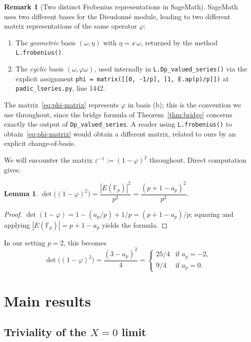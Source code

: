 \documentclass[11pt,a4paper]{amsart}
\newtheorem{lemma}[theorem]{Lemma}
\theoremstyle{definition}
\newtheorem{remark}[theorem]{Remark}
\newcommand{\F}{\mathbb{F}}
\newcommand{\eps}{\varepsilon}
\begin{document}
\begin{remark}[Two distinct Frobenius representations in SageMath]\label{rem:two-bases}
SageMath uses two different bases for the Dieudonn\'e module, leading to two different matrix representations of the same operator $\varphi$:
\begin{enumerate}
\item[(a)] The \emph{geometric} basis $(\omega, \eta)$ with $\eta = x\,\omega$, returned by the method \texttt{L.frobenius()}.
\item[(b)] The \emph{cyclic} basis $(\omega, \varphi\omega)$, used internally in \texttt{L.Dp\_valued\_series()} via the explicit assignment \texttt{phi = matrix([[0, -1/p], [1, E.ap(p)/p]])} at \texttt{padic\_lseries.py}, line 1442.
\end{enumerate}
The matrix~\eqref{eq:phi-matrix} represents $\varphi$ in basis (b); this is the convention we use throughout, since the bridge formula of Theorem~\ref{thm:bridge} concerns exactly the output of \texttt{Dp\_valued\_series}. A reader using \texttt{L.frobenius()} to obtain~\eqref{eq:phi-matrix} would obtain a different matrix, related to ours by an explicit change-of-basis.
\end{remark}

We will encounter the matrix $\eps^{-1} := (1 - \varphi)^2$ throughout. Direct computation gives:
\begin{lemma}\label{lem:det-eps}
$\det\bigl((1 - \varphi)^2\bigr) = \dfrac{|E(\F_p)|^2}{p^2} = \dfrac{(p + 1 - a_p)^2}{p^2}$.
\end{lemma}
\begin{proof}
$\det(1 - \varphi) = 1 - (a_p/p) + 1/p = (p + 1 - a_p)/p$; squaring and applying $|E(\F_p)| = p + 1 - a_p$ yields the formula.
\end{proof}
In our setting $p = 2$, this becomes
\begin{equation}\label{eq:det-eps-explicit}
\det\bigl((1 - \varphi)^2\bigr) = \frac{(3 - a_p)^2}{4} = \begin{cases} 25/4 & \text{if } a_p = -2, \\ 9/4 & \text{if } a_p = 0. \end{cases}
\end{equation}

\section{Main results}\label{sec:main}

\subsection{Triviality of the $X=0$ limit}\label{ssec:trivial}
\end{document}
